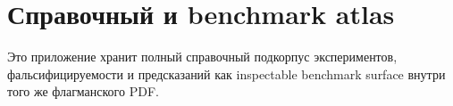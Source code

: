 \section{Справочный и benchmark atlas}
\label{sec:oc-core-1-3-reference-benchmark-atlas}

Это приложение хранит полный справочный подкорпус экспериментов,
фальсифицируемости и предсказаний как inspectable benchmark surface внутри
того же флагманского PDF.

\begingroup
\let\ocappendixsection\section
\let\ocappendixsubsection\subsection
\let\ocappendixsubsubsection\subsubsection
\renewcommand{\section}{\ocappendixsubsection}
\renewcommand{\subsection}{\ocappendixsubsubsection}

\endgroup
